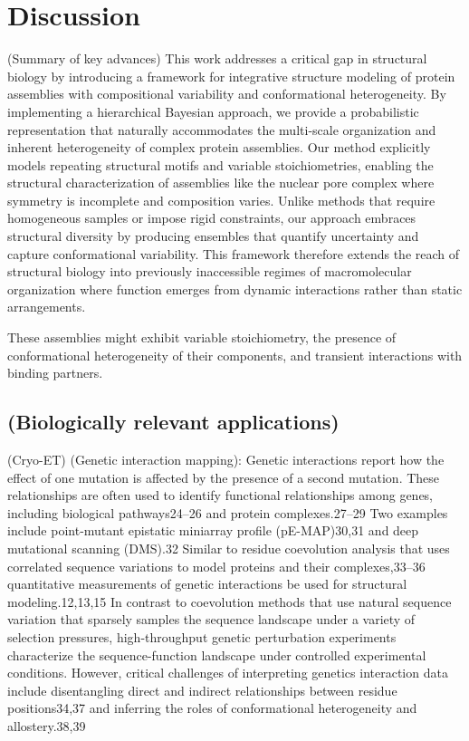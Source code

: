 \documentclass[pdflatex,sn-mathphys-num]{sn-jnl}%
\theoremstyle{thmstyleone}%
\theoremstyle{thmstyletwo}%
\theoremstyle{thmstylethree}%
\begin{document}
{\section{Discussion}
(Summary of key advances) This work addresses a critical gap in structural biology by introducing a framework for integrative structure modeling of protein assemblies with compositional variability and conformational heterogeneity. By implementing a hierarchical Bayesian approach, we provide a probabilistic representation that naturally accommodates the multi-scale organization and inherent heterogeneity of complex protein assemblies. Our method explicitly models repeating structural motifs and variable stoichiometries, enabling the structural characterization of assemblies like the nuclear pore complex where symmetry is incomplete and composition varies. Unlike methods that require homogeneous samples or impose rigid constraints, our approach embraces structural diversity by producing ensembles that quantify uncertainty and capture conformational variability. This framework therefore extends the reach of structural biology into previously inaccessible regimes of macromolecular organization where function emerges from dynamic interactions rather than static arrangements.

These assemblies might exhibit variable stoichiometry, the presence of conformational heterogeneity of their components, and transient interactions with binding partners. 

\subsection{(Biologically relevant applications)}

(Cryo-ET)
(Genetic interaction mapping): Genetic interactions report how the effect of one mutation is affected by the presence of a second mutation. These relationships are often used to identify functional relationships among genes, including biological pathways24–26 and protein complexes.27–29 Two examples include point-mutant epistatic miniarray profile (pE-MAP)30,31 and deep mutational scanning (DMS).32 Similar to residue coevolution analysis that uses correlated sequence variations to model proteins and their complexes,33–36 quantitative measurements of genetic interactions be used for structural modeling.12,13,15 In contrast to coevolution methods that use natural sequence variation that sparsely samples the sequence landscape under a variety of selection pressures, high-throughput genetic perturbation experiments characterize the sequence-function landscape under controlled experimental conditions. However, critical challenges of interpreting genetics interaction data include disentangling direct and indirect relationships between residue positions34,37 and inferring the roles of conformational heterogeneity and allostery.38,39 

}
\end{document}
